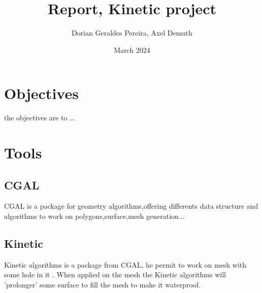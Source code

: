 \documentclass{article}
\title{Report, Kinetic project}
\author{Dorian Geraldes Pereira, Axel Demuth}
\date{March 2024}
\begin{document}
\maketitle
\tableofcontents
\newpage
\section{Objectives}
the objectives are to \dots

\newpage
\section{Tools}
\subsection{CGAL}
CGAL is a package for geometry algorithms,offering differents data structure and algorithms
to work on polygons,surface,mesh generation... 
\subsection{Kinetic}
Kinetic algorithms is a package from CGAL, he permit to work on mesh with some hole in it .
When applied on the mesh the Kinetic algorithms will 'prolonger' some surface to fill the mesh to make it 
waterproof.
\nocite{A1}
\printbibliography{} 
\end{document}
